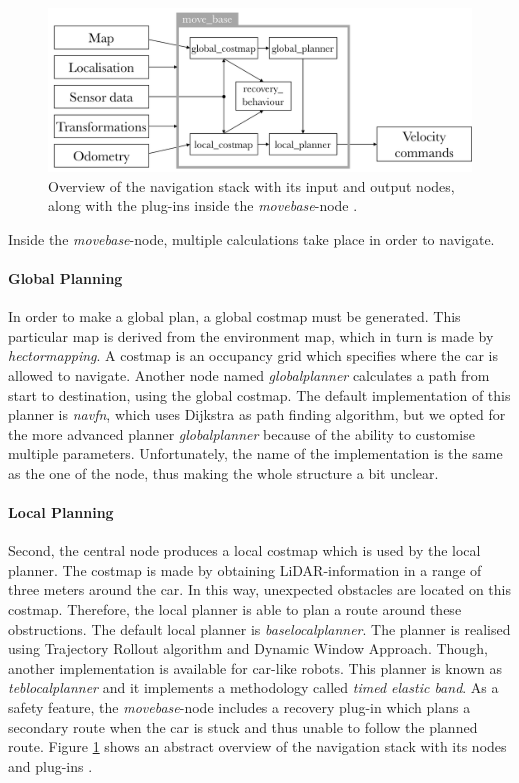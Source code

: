 \documentclass[conference,a4paper]{IEEEtran}
\begin{document}
\begin{figure}[!t]
	\includegraphics[width=\columnwidth]{navstack3}
	\centering
	\caption{Overview of the navigation stack with its input and output nodes, along with the plug-ins inside the \emph{move\textunderscore base}-node \cite{Marder-Eppstein2016}.}
	\label{fig:navstack_global}
\end{figure}

Inside the \textit{move\textunderscore base}-node, multiple calculations take place in order to navigate. 
\paragraph{Global Planning}
In order to make a global plan, a global costmap must be generated. This particular map is derived from the environment map, which in turn is made by \emph{hector\textunderscore mapping}. A costmap is an occupancy grid which specifies where the car is allowed to navigate. Another node named \emph{global\textunderscore planner} calculates a path from start to destination, using the global costmap. The default implementation of this planner is \emph{navfn}, which uses Dijkstra as path finding algorithm, but we opted for the more advanced planner \emph{global\textunderscore planner} because of the ability to customise multiple parameters. Unfortunately, the name of the implementation is the same as the one of the node, thus making the whole structure a bit unclear. 
\paragraph{Local Planning}
Second, the central node produces a local costmap which is used by the local planner. The costmap is made by obtaining LiDAR-information in a range of three meters around the car. In this way, unexpected obstacles are located on this costmap. Therefore, the local planner is able to plan a route around these obstructions. The default local planner is \emph{base\textunderscore local\textunderscore planner}\cite{Marder-Eppstein2017_2}. The planner is realised using Trajectory Rollout algorithm and Dynamic Window Approach\cite{Fox1997, Gerkey2008}. 
Though, another implementation is available for car-like robots. This planner is known as \emph{teb\textunderscore local\textunderscore planner} and it implements a methodology called \emph{timed elastic band}\cite{Rosmann2016}. As a safety feature, the \emph{move\textunderscore base}-node includes a recovery plug-in which plans a secondary route when the car is stuck and thus unable to follow the planned route.
Figure \ref{fig:navstack_global} shows an abstract overview of the navigation stack with its nodes and plug-ins \cite{Marder-Eppstein2016_2, Zheng2016}.
\end{document}
